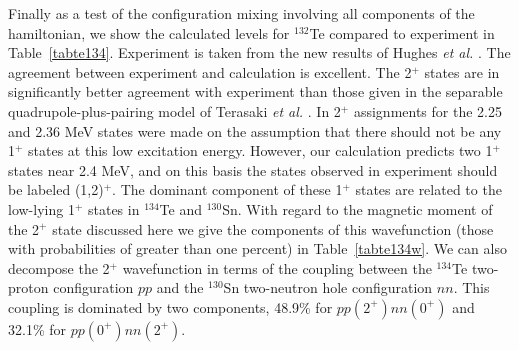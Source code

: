 \documentclass[aps,twocolumn,superscriptaddress,prc,showpacs]{revtex4}
\begin{document}
Finally as a test of the configuration mixing involving all components
of the hamiltonian, we show the calculated levels for $^{132}$Te
compared to experiment in Table~\ref{tabte134}. Experiment is taken from
the new results of Hughes {\em et al.} \cite{hughes}. The agreement between 
experiment and calculation is excellent. The 2$^+$ states are in significantly better
agreement with experiment than those given in the
separable quadrupole-plus-pairing model of Terasaki {\em et al.}                  
\cite{ter02,hughes}. In \cite{hughes} 2$^+$ assignments for the 2.25 and 2.36 MeV
states were made on the assumption that there should not be any 1$^+$
states at this low excitation energy. However, our calculation predicts
two 1$^+$ states near 2.4 MeV, and on this basis the states
observed in experiment should be labeled (1,2)$^+$. The dominant
component of these 1$^+$ states are related to the
low-lying 1$^+$ states in $^{134}$Te and $^{130}$Sn.
With regard to the
magnetic moment of the 2$^+$ state discussed here we give the components
of this wavefunction (those with probabilities of greater than one percent)
in Table~\ref{tabte134w}. We can also decompose the 2$^+$ wavefunction
in terms of the coupling between the $^{134}$Te two-proton
configuration $pp$ and the $^{130}$Sn two-neutron hole configuration $nn$.
This coupling is dominated by two components, 48.9\% for $pp(2^+)nn(0^+)$
and 32.1\% for $pp(0^+)nn(2^+)$.
\begingroup
\end{document}
